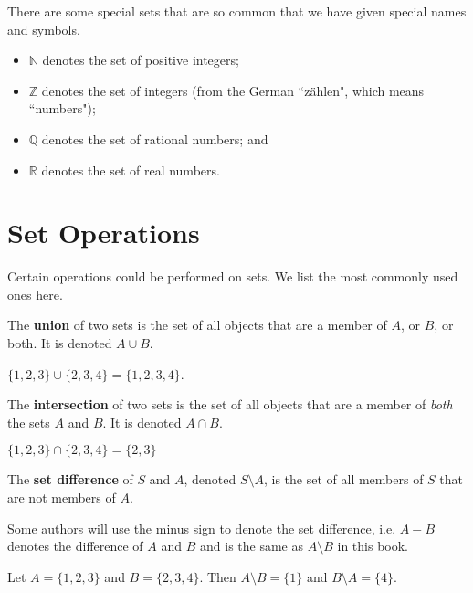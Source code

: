 There are some special sets that are so common that we have given special names and symbols.
\begin{itemize}
    \item $\mathbb{N}$ denotes the set of positive integers;
    \item $\mathbb{Z}$ denotes the set of integers (from the German ``z\"{a}hlen", which means ``numbers");
    \item $\mathbb{Q}$ denotes the set of rational numbers; and
    \item $\mathbb{R}$ denotes the set of real numbers.
\end{itemize}

\newpage

\section{Set Operations}
Certain operations could be performed on sets. We list the most commonly used ones here.

\begin{definition}
    The \textbf{union} of two sets is the set of all objects that are a member of $A$, or $B$, or both. It is denoted $A \cup B$.
\end{definition}
\begin{example}
    $\{1, 2, 3\} \cup \{2, 3, 4\} = \{1, 2, 3, 4\}$.
\end{example}

\begin{definition}
    The \textbf{intersection} of two sets is the set of all objects that are a member of \textit{both} the sets $A$ and $B$. It is denoted $A \cap B$.
\end{definition}
\begin{example}
    $\{1, 2, 3\} \cap \{2, 3, 4\} = \{2, 3\}$
\end{example}

\begin{definition}
    The \textbf{set difference} of $S$ and $A$, denoted $S \setminus A$, is the set of all members of $S$ that are not members of $A$.
\end{definition}
\begin{remark}
    Some authors will use the minus sign to denote the set difference, i.e. $A - B$ denotes the difference of $A$ and $B$ and is the same as $A \setminus B$ in this book.
\end{remark}
\begin{example}
    Let $A = \{1, 2, 3\}$ and $B = \{2, 3, 4\}$. Then $A \setminus B = \{1\}$ and $B \setminus A = \{4\}$.
\end{example}

